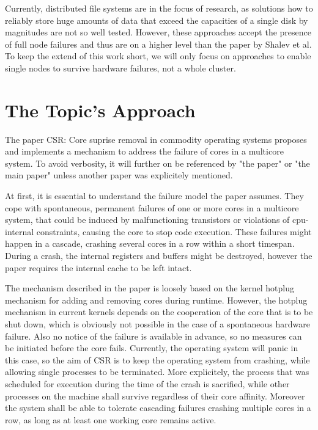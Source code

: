 \documentclass[a4paper,10pt,twoside]{article}
\begin{document}
Currently, distributed file systems are in the focus of research, as solutions how to reliably store huge amounts of data that exceed the capacities of a single disk by magnitudes are not so well tested. However, these approaches accept the presence of full node failures and thus are on a higher level than the paper by Shalev et al. To keep the extend of this work short, we will only focus on approaches to enable single nodes to survive hardware failures, not a whole cluster.

\section{The Topic's Approach}
The paper CSR: Core suprise removal in commodity operating systems \cite{CSR} proposes and implements a mechanism to address the failure of cores in a multicore system. To avoid verbosity, it will further on be referenced by "the paper" or "the main paper" unless another paper was explicitely mentioned.

At first, it is essential to understand the failure model the paper assumes. They cope with spontaneous, permanent failures of one or more cores in a multicore system, that could be induced by malfunctioning transistors or violations of cpu-internal constraints, causing the core to stop code execution. These failures might happen in a cascade, crashing several cores in a row within a short timespan. During a crash, the internal registers and buffers might be destroyed, however the paper requires the internal cache to be left intact.

The mechanism described in the paper is loosely based on the kernel hotplug mechanism for adding and removing cores during runtime. However, the hotplug mechanism in current kernels depends on the cooperation of the core that is to be shut down, which is obviously not possible in the case of a spontaneous hardware failure. Also no notice of the failure is available in advance, so no measures can be initiated before the core fails. Currently, the operating system will panic in this case, so the aim of CSR is to keep the operating system from crashing, while allowing single processes to be terminated. More explicitely, the process that was scheduled for execution during the time of the crash is sacrified, while other processes on the machine shall survive regardless of their core affinity. Moreover the system shall be able to tolerate cascading failures crashing multiple cores in a row, as long as at least one working core remains active.
\end{document}
